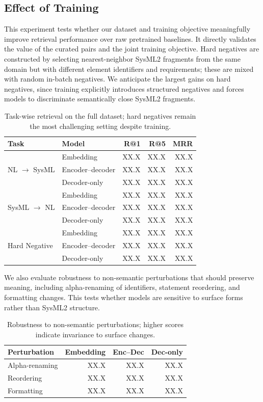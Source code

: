\documentclass{article}
\begin{document}
\subsection{Effect of Training}
This experiment tests whether our dataset and training objective meaningfully improve retrieval performance over raw pretrained baselines. It directly validates the value of the curated pairs and the joint training objective. Hard negatives are constructed by selecting nearest-neighbor SysML2 fragments from the same domain but with different element identifiers and requirements; these are mixed with random in-batch negatives. We anticipate the largest gains on hard negatives, since training explicitly introduces structured negatives and forces models to discriminate semantically close SysML2 fragments.
\begin{table}[H]
\centering
\small
\caption{Task-wise retrieval on the full dataset; hard negatives remain the most challenging setting despite training.}
\label{tab:task-wise}
\begin{tabular}{llrrr}
\toprule
Task & Model & R@1 & R@5 & MRR \\
\midrule
\multirow{3}{*}{NL $\rightarrow$ SysML} & Embedding & XX.X & XX.X & XX.X \\
 & Encoder--decoder & XX.X & XX.X & XX.X \\
 & Decoder-only & XX.X & XX.X & XX.X \\
\midrule
\multirow{3}{*}{SysML $\rightarrow$ NL} & Embedding & XX.X & XX.X & XX.X \\
 & Encoder--decoder & XX.X & XX.X & XX.X \\
 & Decoder-only & XX.X & XX.X & XX.X \\
\midrule
\multirow{3}{*}{Hard Negative} & Embedding & XX.X & XX.X & XX.X \\
 & Encoder--decoder & XX.X & XX.X & XX.X \\
 & Decoder-only & XX.X & XX.X & XX.X \\
\bottomrule
\end{tabular}
\end{table}

We also evaluate robustness to non-semantic perturbations that should preserve meaning, including alpha-renaming of identifiers, statement reordering, and formatting changes. This tests whether models are sensitive to surface forms rather than SysML2 structure.
\begin{table}[H]
\centering
\small
\setlength{\tabcolsep}{3pt}
\caption{Robustness to non-semantic perturbations; higher scores indicate invariance to surface changes.}
\label{tab:robustness}
\begin{tabular}{lrrr}
\toprule
Perturbation & Embedding & Enc--Dec & Dec-only \\
\midrule
Alpha-renaming & XX.X & XX.X & XX.X \\
Reordering & XX.X & XX.X & XX.X \\
Formatting & XX.X & XX.X & XX.X \\
\bottomrule
\end{tabular}
\end{table}
\end{document}
